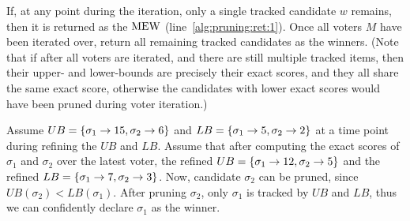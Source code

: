 If, at any point during the iteration, only a single tracked candidate $w$ remains, then it is returned as the $\text{MEW}$ (line~\ref{alg:pruning:ret:1}).  Once all voters $M$ have been iterated over, return all remaining tracked candidates as the winners.  (Note that if after all voters are iterated, and there are still multiple tracked items, then their upper- and lower-bounds are precisely their exact scores, and they all share the same exact score, otherwise the candidates with lower exact scores would have been pruned during voter iteration.)

\begin{example}
  Assume $UB=\{ \sigma_1 \rightarrow 15, \sigma_2 \rightarrow 6 \}$ and $LB = \{ \sigma_1 \rightarrow 5, \sigma_2 \rightarrow 2 \}$ at a time point during refining the $UB$ and $LB$.
  Assume that after computing the exact scores of $\sigma_1$ and $\sigma_2$ over the latest voter, the refined $UB=\{ \sigma_1 \rightarrow 12, \sigma_2 \rightarrow 5 \}$ and the refined $LB = \{ \sigma_1 \rightarrow 7, \sigma_2 \rightarrow 3 \}$.
  Now, candidate $\sigma_2$ can be pruned, since $UB(\sigma_2) < LB(\sigma_1)$.
  After pruning $\sigma_2$, only $\sigma_1$ is tracked by $UB$ and $LB$, thus we can confidently declare $\sigma_1$ as the winner.
\end{example}

\paragraph{}
